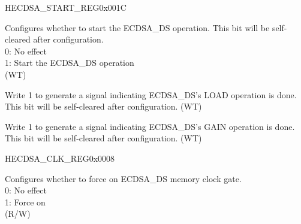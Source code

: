 \begin{register}{H}{ECDSA\_START\_REG}{0x001C}\label{regdesc:ECDSASTARTREG}
%
%
%
%
\regnewline%
\begin{regdesc}\begin{reglist}
\label{fielddesc:ECDSASTART}\item [ECDSA\_START] Configures whether to start the ECDSA\_DS operation. This bit will be self-cleared after configuration. \\
0: No effect\\
1: Start the ECDSA\_DS operation\\
(WT)
\label{fielddesc:ECDSALOADDONE}\item [ECDSA\_LOAD\_DONE] Write 1 to generate a signal indicating ECDSA\_DS's LOAD operation is done. This bit will be self-cleared after configuration. (WT)
\label{fielddesc:ECDSAGETDONE}\item [ECDSA\_GET\_DONE] Write 1 to generate a signal indicating ECDSA\_DS's GAIN operation is done. This bit will be self-cleared after configuration. (WT)
\end{reglist}\end{regdesc}
\end{register}


\begin{register}{H}{ECDSA\_CLK\_REG}{0x0008}\label{regdesc:ECDSACLKREG}
%
%
\regnewline%
\begin{regdesc}\begin{reglist}
\label{fielddesc:ECDSACLKGATEFORCEON}\item [ECDSA\_CLK\_GATE\_FORCE\_ON] Configures whether to force on ECDSA\_DS memory clock gate. \\
0: No effect\\
1: Force on\\
(R/W)
\end{reglist}\end{regdesc}
\end{register}


